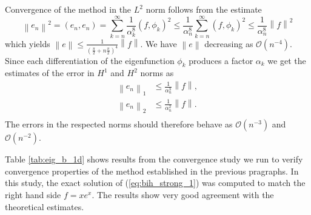 \documentclass[a4paper,10pt]{article}
\newcommand{\norm}[1]{\ensuremath{\left\|#1\right\|}}
\newcommand{\inner}[2]{\ensuremath{\left(#1, #2\right)}}
\begin{document}
  Convergence of the method in the $L^2$ norm follows from the estimate
  \[
    \norm{e_n}^2=\inner{e_n}{e_n} = \sum_{k=n}^{\infty} \frac{1}{\alpha^8_k}(f, \phi_k)^2 \leq
      \frac{1}{\alpha^8_n}\sum_{k=n}^{\infty} (f, \phi_k)^2 \leq
      \frac{1}{\alpha^8_n}\norm{f}^2
  \]
  which yields $\norm{e}\leq\frac{1}{\left(\frac{\pi}{2} +
  n\frac{\pi}{2}\right)^4}\norm{f}$. We have $\norm{e}$ decreasing as
  $\mathcal{O}(n^{-4})$. Since each differentiation of the eigenfunction 
  $\phi_k$ produces a factor $\alpha_k$ we get the estimates of the error in 
  $H^1$ and $H^2$ norms as
  \begin{align*}
    \norm{e_n}_1 &\leq \frac{1}{\alpha^3_n}\norm{f}, \\
    \norm{e_n}_2 &\leq \frac{1}{\alpha^2_n}\norm{f}. \\
  \end{align*}
  The errors in the respected norms should therefore behave as
  $\mathcal{O}(n^{-3})$ and $\mathcal{O}(n^{-2})$.
    
  Table \ref{tab:eig_b_1d} shows results from the convergence study we run to
  verify convergence properties of the method established in the previous
  pragraphs. In this study, the exact solution of (\ref{eq:bih_strong_1}) was
  computed to match the right hand side $f=x e^x$. The results show very good
  agreement with the theoretical estimates.
\end{document}
